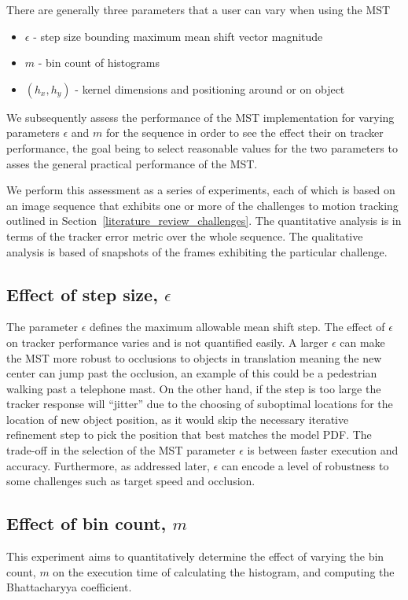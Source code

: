 There are generally three parameters that a user can vary when using the MST
\begin{itemize}
    \item $\epsilon$ - step size bounding maximum mean shift vector magnitude
    \item $m$ - bin count of histograms
    \item $(h_x,h_y)$ - kernel dimensions and positioning around or on object
\end{itemize}
We subsequently assess the performance of the MST implementation
for varying parameters $\epsilon$ and $m$ for the sequence in order to see the
effect their on tracker performance, the goal being to select reasonable values
for the two parameters to asses the general practical performance of the MST. 

We perform this assessment as a series of experiments, each of which is based on an image
sequence that exhibits one or more of the challenges to motion tracking
outlined in Section~\ref{literature_review_challenges}. 
The quantitative analysis is in terms of the tracker error metric over the whole
sequence. The qualitative analysis is based of snapshots of the frames
exhibiting the particular challenge.

\subsection{Effect of step size, $\epsilon$}\label{results_eps}
The parameter $\epsilon$ defines the maximum allowable mean shift step. The
effect of $\epsilon$ on tracker performance varies and is not quantified easily.
A larger $\epsilon$ can make the MST more robust to occlusions to objects in
translation meaning the new center can jump past the occlusion, an example of
this could be a pedestrian walking past a telephone mast. On the other hand,
if the step is too large the tracker response will ``jitter'' due to the
choosing of suboptimal locations for the location of new object position, as it
would skip the necessary iterative refinement step to pick the position that best
matches the model PDF\@. 
The trade-off in the selection of the MST parameter $\epsilon$ is between faster
execution and accuracy.
Furthermore, as addressed later, $\epsilon$ can encode a level of robustness to some challenges such
as target speed and occlusion. 

\subsection{Effect of bin count, $m$}\label{results_m}
This experiment aims to quantitatively determine the effect of varying the
bin count, $m$ on the execution time of calculating the histogram, and computing
the Bhattacharyya coefficient.

